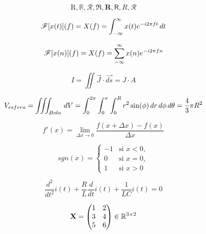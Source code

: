 \begin{center}
\begin{equation*}
    \mathrm{R}, \mathbb{R}, \mathcal{R}, \mathfrak{R}, \mathbf{R}, \mathsf{R}, \mathit{R}, \mathscr{R}
\end{equation*}

\begin{equation*}
\mathscr{F}[x(t)](f)=X(f)=\int_{-\infty}^{\infty} x(t) e^{-i 2\pi f t}\, dt
\end{equation*}

\begin{equation*}
\mathscr{F}[x(n)](f)=X(f)=\sum_{-\infty}^{\infty} x(n) e^{-i 2\pi f n}
\end{equation*}

\begin{equation*}
I = \iint{\overrightarrow{J}\cdot\overrightarrow{ds}}=J\cdot A
\end{equation*}

\begin{equation*}
V_{esfera} = \iiint_{Bola}\,dV = \int_{0}^{2\pi}\int_{0}^{\pi}\int_{0}^{R}{r^2\sin(\phi)}\,dr\,d\phi\,d\theta=\frac{4}{3}\pi R^2
\end{equation*}

\begin{equation*}
f'(x)=\lim_{\Delta x \to 0} \frac{f(x+\Delta x)-f(x)}{\Delta x}
\end{equation*}

\begin{equation*}
	sgn(x) = \begin{cases}
	-1 & \text{si } x<0,\\
	0 & \text{si } x=0,\\
        1 & \text{si } x>0
	\end{cases}
\end{equation*}

\begin{equation*}
	\frac{d^2}{dt^2}i(t)+\frac{R}{L}\frac{d}{dt}i(t)+\frac{1}{LC}i(t)=0
\end{equation*}

\begin{equation*}
    \mathbf{X} = 
            \begin{pmatrix}
                1&2\\
                3&4\\
                5&6
            \end{pmatrix}\in \mathbb{R}^{3\times 2}
\end{equation*}
\end{center}

